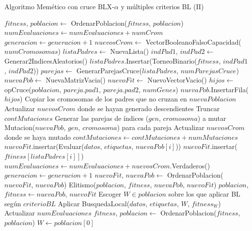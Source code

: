 \documentclass[11pt,a4paper]{article}
\begin{document}
\begin{algorithm}[H]
\caption{Algoritmo Memético con cruce BLX-$\alpha$ y múltiples criterios BL (II)}
\begin{algorithmic}
\State $fitness$, $poblacion \gets$ OrdenarPoblacion($fitness$, $poblacion$)
\State $numEvaluaciones \gets numEvaluaciones + numCrom$
\State $generacion \gets generacion + 1$
	\State $nuevosCrom \gets$ VectorBooleanoFalsoCapacidad($numCromosomas$)
	\State $listaPadres \gets $ NuevaLista()
		\State $indPad1$, $indPad2 \gets$ Generar2IndicesAleatorios()
		\State $listaPadres$.Insertar(TorneoBinario($fitness$, $indPad1$, $indPad2$))
	\EndFor
	\State $parejas \gets$ GenerarParejasCruce($listaPadres$, $numParejasCruce$)
	\State $nuevaPob \gets$ NuevaMatrizVacia()
	\State $nuevoFit \gets$ NuevoVectorVacio()
		\State $hijos \gets $ opCruce($poblacion$, $pareja.pad1$, $pareja.pad2$, $numGenes$)
		\State $nuevaPob$.InsertarFila($hijos$)
	\EndFor
	\State Copiar los cromosomas de los padres que no cruzan en $nuevaPoblacion$
	\State Actualizar $nuevosCrom$ donde se hayan generado descendientes
		\State Truncar $contMutaciones$
		\State Generar las parejas de índices ($gen$, $cromosoma$) a mutar
		\State Mutacion($nuevaPob$, $gen$, $cromosoma$) para cada pareja
		\State Actualizar $nuevosCrom$ donde se haya mutado
	\Else
		\State $contMutaciones \gets contMutaciones + numMutaciones$
	\EndIf
			\State $nuevoFit$.insertar(Evaluar($datos$, $etiquetas$, $nuevaPob[i]$))
		\Else
			\State $nuevoFit$.insertar($ftiness[listaPadres[i]]$)
		\EndIf
	\EndFor
	\State $numEvaluaciones \gets numEvaluaciones + nuevosCrom$.Verdaderos()
	\State $generacion \gets generacion + 1$
	\State $nuevoFit$, $nuevaPob \gets$ OrdenarPoblacion($nuevoFit$, $nuevaPob$)
	\State Elitismo($poblacion$, $fitness$, $nuevaPob$, $nuevoFit$)
	\State $poblacion$, $fitness \gets nuevaPob$, $nuevoFit$
		\State Escoger $W \in poblacion$ sobre los que aplicar BL según $criterioBL$
		\State Aplicar BusquedaLocal($datos$, $etiquetas$, $W$, $fitness_W$)
		\State Actualizar $numEvaluaciones$
		\State $fitness$, $poblacion \gets$ OrdenarPoblacion($fitness$, $poblacion$) 
	\EndIf
\EndWhile
\State $W \gets poblacion[0]$
\State {}
\EndFunction
\end{algorithmic}
\end{algorithm}
\end{document}
